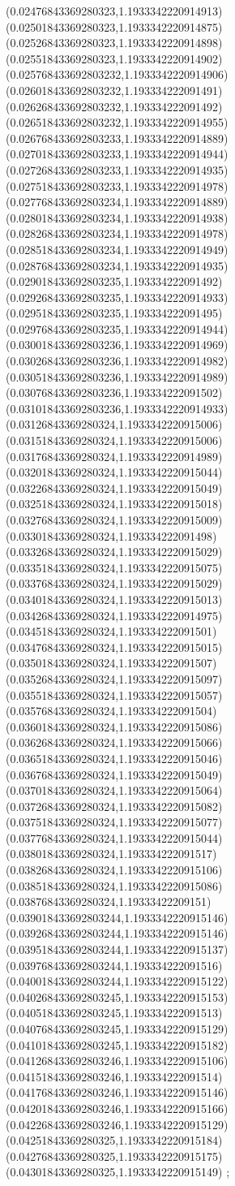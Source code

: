 {(0.02476843369280323,1.1933342220914913)
(0.02501843369280323,1.1933342220914875)
(0.02526843369280323,1.1933342220914898)
(0.02551843369280323,1.1933342220914902)
(0.025768433692803232,1.1933342220914906)
(0.026018433692803232,1.193334222091491)
(0.026268433692803232,1.193334222091492)
(0.026518433692803232,1.1933342220914955)
(0.026768433692803233,1.1933342220914889)
(0.027018433692803233,1.1933342220914944)
(0.027268433692803233,1.1933342220914935)
(0.027518433692803233,1.1933342220914978)
(0.027768433692803234,1.1933342220914889)
(0.028018433692803234,1.1933342220914938)
(0.028268433692803234,1.1933342220914978)
(0.028518433692803234,1.1933342220914949)
(0.028768433692803234,1.1933342220914935)
(0.029018433692803235,1.193334222091492)
(0.029268433692803235,1.1933342220914933)
(0.029518433692803235,1.193334222091495)
(0.029768433692803235,1.1933342220914944)
(0.030018433692803236,1.1933342220914969)
(0.030268433692803236,1.1933342220914982)
(0.030518433692803236,1.1933342220914989)
(0.030768433692803236,1.193334222091502)
(0.031018433692803236,1.1933342220914933)
(0.03126843369280324,1.1933342220915006)
(0.03151843369280324,1.1933342220915006)
(0.03176843369280324,1.1933342220914989)
(0.03201843369280324,1.1933342220915044)
(0.03226843369280324,1.1933342220915049)
(0.03251843369280324,1.1933342220915018)
(0.03276843369280324,1.1933342220915009)
(0.03301843369280324,1.193334222091498)
(0.03326843369280324,1.1933342220915029)
(0.03351843369280324,1.1933342220915075)
(0.03376843369280324,1.1933342220915029)
(0.03401843369280324,1.1933342220915013)
(0.03426843369280324,1.1933342220914975)
(0.03451843369280324,1.193334222091501)
(0.03476843369280324,1.1933342220915015)
(0.03501843369280324,1.193334222091507)
(0.03526843369280324,1.1933342220915097)
(0.03551843369280324,1.1933342220915057)
(0.03576843369280324,1.193334222091504)
(0.03601843369280324,1.1933342220915086)
(0.03626843369280324,1.1933342220915066)
(0.03651843369280324,1.1933342220915046)
(0.03676843369280324,1.1933342220915049)
(0.03701843369280324,1.1933342220915064)
(0.03726843369280324,1.1933342220915082)
(0.03751843369280324,1.1933342220915077)
(0.03776843369280324,1.1933342220915044)
(0.03801843369280324,1.193334222091517)
(0.03826843369280324,1.1933342220915106)
(0.03851843369280324,1.1933342220915086)
(0.03876843369280324,1.19333422209151)
(0.039018433692803244,1.1933342220915146)
(0.039268433692803244,1.1933342220915146)
(0.039518433692803244,1.1933342220915137)
(0.039768433692803244,1.193334222091516)
(0.040018433692803244,1.1933342220915122)
(0.040268433692803245,1.1933342220915153)
(0.040518433692803245,1.193334222091513)
(0.040768433692803245,1.1933342220915129)
(0.041018433692803245,1.1933342220915182)
(0.041268433692803246,1.1933342220915106)
(0.041518433692803246,1.193334222091514)
(0.041768433692803246,1.1933342220915146)
(0.042018433692803246,1.1933342220915166)
(0.042268433692803246,1.1933342220915129)
(0.04251843369280325,1.1933342220915184)
(0.04276843369280325,1.1933342220915175)
(0.04301843369280325,1.1933342220915149)
};
